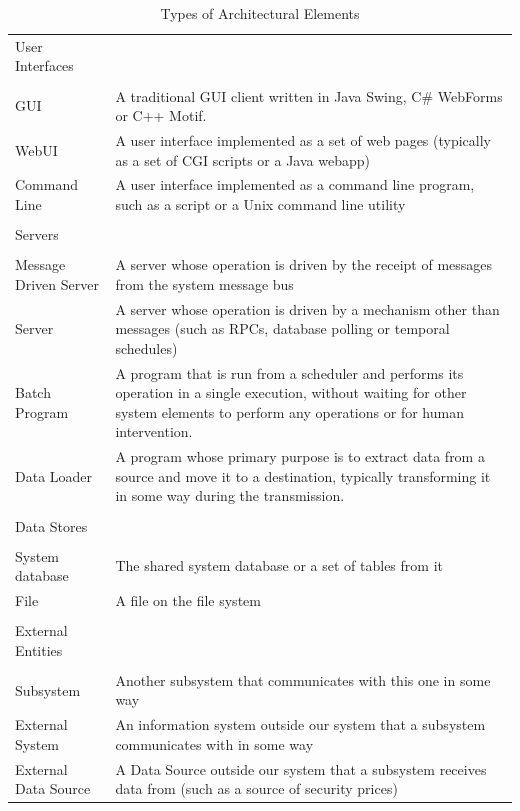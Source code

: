   
\begin{table}
\caption{Types of Architectural Elements}
\label{table:archelemtypes}
\footnotesize

\begin{tabular}{l p{10cm}}

User Interfaces \\
\cline{1-1}
& \\
GUI   & A traditional GUI client written in Java Swing, C\# WebForms or C++ Motif. \\
WebUI & A user interface implemented as a set of web pages (typically as a set of CGI scripts or a Java webapp) \\
Command Line & A user interface implemented as a command line program, such as a script or a Unix command line utility \\
& \\
Servers \\
\cline{1-1}
& \\
Message Driven Server & A server whose operation is driven by the receipt of messages from the system message bus \\
Server                &  A server whose operation is driven by a mechanism other than messages (such as RPCs, database polling or temporal schedules) \\
Batch Program         & A program that is run from a scheduler and performs its operation in a single execution, without waiting for other system elements to perform any operations or for human intervention. \\
Data Loader           & A program whose primary purpose is to extract data from a source and move it to a destination, typically transforming it in some way during the transmission. \\
& \\
Data Stores  \\
\cline{1-1}
& \\
System database   &  The shared system database or a set of tables from it \\
File              & A file on the file system \\
& \\
External Entities  \\
\cline{1-1}
& \\
Subsystem            & Another subsystem that communicates with this one in some way \\
External System      & An information system outside our system that a subsystem communicates with in some way \\
External Data Source & A Data Source outside our system that a subsystem receives data from (such as a source of security prices)
\end{tabular}
\end{table}

